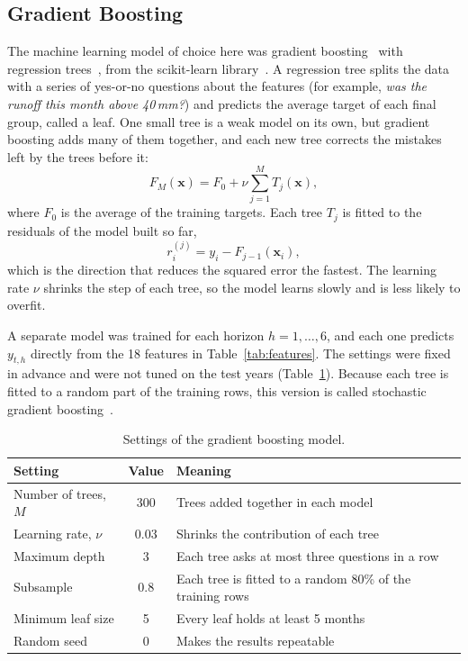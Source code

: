 \documentclass{article}
\begin{document}
\subsection{Gradient Boosting}
\label{sec:gb}

The machine learning model of choice here was gradient boosting~\cite{friedman2001} with
regression trees~\cite{cart}, from the scikit-learn library~\cite{sklearn}. A regression tree
splits the data with a series of yes-or-no questions
about the features (for example, \emph{was the runoff this month above 40\,mm?}) and predicts
the average target of each final group, called a leaf. One small tree is a weak model on its
own, but gradient boosting adds many of them together, and each new tree corrects the mistakes
left by the trees before it:
\begin{equation}
F_M(\mathbf{x}) = F_0 + \nu \sum_{j=1}^{M} T_j(\mathbf{x}), \label{eq:gb}
\end{equation}
where $F_0$ is the average of the training targets. Each tree $T_j$ is fitted to the residuals
of the model built so far,
\begin{equation}
r^{(j)}_i = y_i - F_{j-1}(\mathbf{x}_i), \label{eq:resid}
\end{equation}
which is the direction that reduces the squared error the fastest. The learning rate $\nu$
shrinks the step of each tree, so the model learns slowly and is less likely to overfit.

A separate model was trained for each horizon $h = 1, \dots, 6$, and each one predicts $y_{t,h}$
directly from the 18 features in Table~\ref{tab:features}. The settings were fixed in advance and
were not tuned on the test years (Table~\ref{tab:gbsettings}). Because each tree is fitted to a
random part of the training rows, this version is called stochastic gradient
boosting~\cite{friedman2002}.

\begin{table}[htbp]
\centering
\caption{Settings of the gradient boosting model.}
\label{tab:gbsettings}
\begin{tabular}{||l|c|l||}
\hline\hline
Setting & Value & Meaning \\
\hline\hline
Number of trees, $M$ & 300 & Trees added together in each model \\
Learning rate, $\nu$ & 0.03 & Shrinks the contribution of each tree \\
Maximum depth & 3 & Each tree asks at most three questions in a row \\
Subsample & 0.8 & Each tree is fitted to a random 80\% of the training rows \\
Minimum leaf size & 5 & Every leaf holds at least 5 months \\
Random seed & 0 & Makes the results repeatable \\
\hline\hline
\end{tabular}
\end{table}
\end{document}
